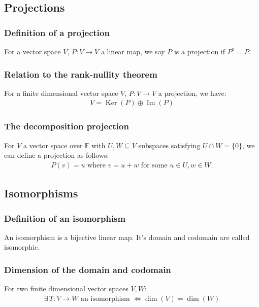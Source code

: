 \documentclass[a4paper, 12pt, twoside]{article}
\DeclareMathOperator{\Ker}{Ker}
\DeclareMathOperator{\Ima}{Im}
\begin{document}
\subsection{Projections}

\subsubsection{Definition of a projection}

For a vector space $V$, $P : V \to V$ a linear map, we say $P$
is a projection if $P^2 = P$.

\subsubsection{Relation to the rank-nullity theorem}

For a finite dimensional vector space $V$, $P : V \to V$ a projection,
we have:
\begin{align*}
  V = \Ker(P) \oplus \Ima(P)
\end{align*}

\subsubsection{The decomposition projection}

For $V$ a vector space over $\mathbb{F}$ with $U, W \subseteq V$
subspaces satisfying $U \cap W = \{0\}$, we can define a projection
as follows:
\begin{align*}
  P(v) = u \text{ where } v = u + w \text{ for some } u \in U, w \in W.
\end{align*}

\subsection{Isomorphisms}

\subsubsection{Definition of an isomorphism}

An isomorphism is a bijective linear map. It's domain and codomain
are called isomorphic.

\subsubsection{Dimension of the domain and codomain}

For two finite dimensional vector spaces $V, W$:
\begin{gather*}
  \exists \, T : V \to W \text{ an isomorphism } \Leftrightarrow
  \dim(V) = \dim(W)
\end{gather*}
\end{document}
